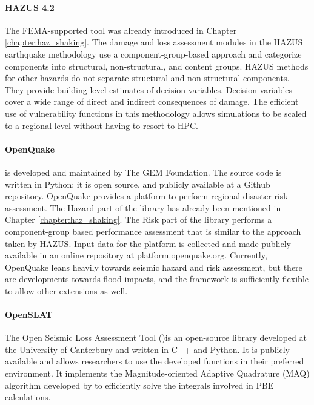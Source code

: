 \paragraph{HAZUS 4.2} The FEMA-supported  tool was already introduced in Chapter \ref{chapter:haz_shaking}. The damage and loss assessment modules in the HAZUS earthquake methodology use a component-group-based approach and categorize components into structural, non-structural, and content groups. HAZUS methods for other hazards do not separate structural and non-structural components. They provide building-level estimates of decision variables. Decision variables cover a wide range of direct and indirect consequences of damage. The efficient use of vulnerability functions in this methodology allows simulations to be scaled to a regional level without having to resort to HPC.

\paragraph{OpenQuake} 
 is developed and maintained by The GEM Foundation. The source code is written in Python; it is open source, and publicly available at a Github repository. OpenQuake provides a platform to perform regional disaster risk assessment. The Hazard part of the library has already been mentioned in Chapter \ref{chapter:haz_shaking}. The Risk part of the library performs a component-group based performance assessment that is similar to the approach taken by HAZUS. Input data for the platform is collected and made publicly available in an online repository at platform.openquake.org. Currently, OpenQuake leans heavily towards seismic hazard and risk assessment, but there are developments towards flood impacts, and the framework is sufficiently flexible to allow other extensions as well.

\paragraph{OpenSLAT} The Open Seismic Loss Assessment Tool ()is an open-source library developed at the University of Canterbury and written in C++ and Python. It is publicly available and allows researchers to use the developed functions in their preferred environment. It implements the Magnitude-oriented Adaptive Quadrature (MAQ) algorithm developed by \citet{bradley2010efficient} to efficiently solve the integrals involved in PBE calculations.

